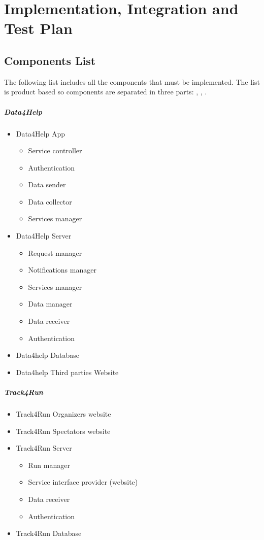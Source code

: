
 \chapter{Implementation, Integration and Test Plan}

	\section{Components List}
		The following list includes all the components that must be implemented. The list is product based so components are separated in three parts: , , . 
		\paragraph{Data4Help}
		\begin{itemize}
			\item{Data4Help App}
				\begin{itemize}
					\item{Service controller}
					\item{Authentication}
					\item{Data sender}
					\item{Data collector}
					\item{Services manager}
				\end{itemize}
			\item{Data4Help Server}
				\begin{itemize}
					\item{Request manager}
					\item{Notifications manager}
					\item{Services manager}
					\item{Data manager}
					\item{Data receiver}
					\item{Authentication}
				\end{itemize}
			\item{Data4help Database}
			\item{Data4help Third parties Website}
		\end{itemize}
		\paragraph{Track4Run}
		\begin{itemize}
			\item{Track4Run Organizers website}
			\item{Track4Run Spectators website}
			\item{Track4Run Server}
				\begin{itemize}
					\item{Run manager}
					\item{Service interface provider (website)}
					\item{Data receiver}
					\item{Authentication}
				\end{itemize}
			\item{Track4Run Database}
		\end{itemize}
